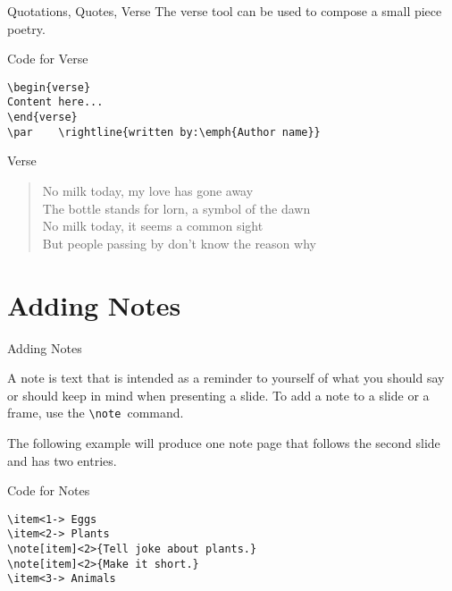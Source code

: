 \documentclass[10pt,xcolor=x11names]{beamer}
\begin{document}
\begin{frame}{Quotations, Quotes, Verse}
\vspace{10pt}
The \alert{verse}  tool can be used to compose a small piece poetry.

\begin{exampleblock}{Code for Verse}	
\begin{verbatim}
\begin{verse}
Content here...
\end{verse}
\par 	\rightline{written by:\emph{Author name}} 
\end{verbatim}
\end{exampleblock}

\begin{exampleblock}{Verse}	
	\begin{verse}
No milk today, my love has gone away\\
The bottle stands for lorn, a symbol of the dawn\\
No milk today, it seems a common sight\\
But people passing by don't know the reason why
\par 	{}  
	\end{verse}
\end{exampleblock}

\end{frame}

\section{Adding Notes}

\begin{frame}[fragile]{Adding Notes} 

A note is text that is intended as a reminder to yourself of what you should say or should keep in mind when presenting a slide. To add a note to a slide or a frame, use the \verb|\note |command. \vspace{5pt}

The following example will produce one note page that follows the second slide and has two entries.

\begin{exampleblock}{Code for Notes}
	\begin{verbatim}
\item<1-> Eggs
\item<2-> Plants
\note[item]<2>{Tell joke about plants.}
\note[item]<2>{Make it short.}
\item<3-> Animals
	\end{verbatim}
\end{exampleblock}

\end{frame}
\end{document}
